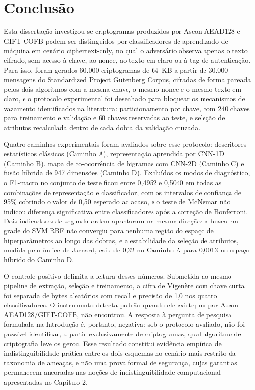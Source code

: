 \chapter{Conclusão}
\label{cap:conclusao}

Esta dissertação investigou se criptogramas produzidos por Ascon-AEAD128 e GIFT-COFB podem ser distinguidos por classificadores de aprendizado de máquina em cenário ciphertext-only, no qual o adversário observa apenas o texto cifrado, sem acesso à chave, ao nonce, ao texto em claro ou à tag de autenticação. Para isso, foram gerados 60.000 criptogramas de 64~KB a partir de 30.000 mensagens do Standardized Project Gutenberg Corpus, cifradas de forma pareada pelos dois algoritmos com a mesma chave, o mesmo nonce e o mesmo texto em claro, e o protocolo experimental foi desenhado para bloquear os mecanismos de vazamento identificados na literatura: particionamento por chave, com 240 chaves para treinamento e validação e 60 chaves reservadas ao teste, e seleção de atributos recalculada dentro de cada dobra da validação cruzada.

Quatro caminhos experimentais foram avaliados sobre esse protocolo: descritores estatísticos clássicos (Caminho A), representação aprendida por CNN-1D (Caminho B), mapa de co-ocorrência de bigramas com CNN-2D (Caminho C) e fusão híbrida de 947 dimensões (Caminho D). Excluídos os modos de diagnóstico, o F1-macro no conjunto de teste ficou entre 0,4952 e 0,5040 em todas as combinações de representação e classificador, com os intervalos de confiança de 95\% cobrindo o valor de 0,50 esperado ao acaso, e o teste de McNemar não indicou diferença significativa entre classificadores após a correção de Bonferroni. Dois indicadores de segunda ordem apontaram na mesma direção: a busca em grade do SVM RBF não convergiu para nenhuma região do espaço de hiperparâmetros ao longo das dobras, e a estabilidade da seleção de atributos, medida pelo índice de Jaccard, caiu de 0,32 no Caminho A para 0,0013 no espaço híbrido do Caminho D.

O controle positivo delimita a leitura desses números. Submetida ao mesmo pipeline de extração, seleção e treinamento, a cifra de Vigenère com chave curta foi separada de bytes aleatórios com recall e precisão de 1,0 nos quatro classificadores. O instrumento detecta padrão quando ele existe; no par Ascon-AEAD128/GIFT-COFB, não encontrou. A resposta à pergunta de pesquisa formulada na Introdução é, portanto, negativa: sob o protocolo avaliado, não foi possível identificar, a partir exclusivamente de criptogramas, qual algoritmo de criptografia leve os gerou. Esse resultado constitui evidência empírica de indistinguibilidade prática entre os dois esquemas no cenário mais restrito da taxonomia de ameaças, e não uma prova formal de segurança, cujas garantias permanecem ancoradas nas noções de indistinguibilidade computacional apresentadas no Capítulo 2.

